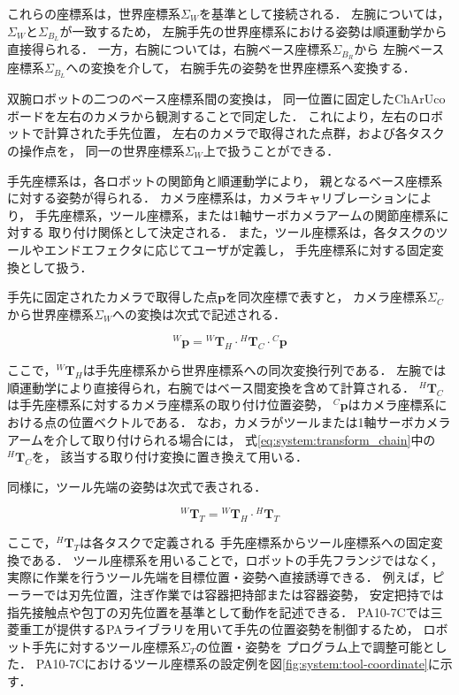 これらの座標系は，世界座標系$\Sigma_W$を基準として接続される．
左腕については，$\Sigma_W$と$\Sigma_{B_L}$が一致するため，
左腕手先の世界座標系における姿勢は順運動学から直接得られる．
一方，右腕については，右腕ベース座標系$\Sigma_{B_R}$から
左腕ベース座標系$\Sigma_{B_L}$への変換を介して，
右腕手先の姿勢を世界座標系へ変換する．

双腕ロボットの二つのベース座標系間の変換は，
同一位置に固定したChArUcoボードを左右のカメラから観測することで同定した．
これにより，左右のロボットで計算された手先位置，
左右のカメラで取得された点群，および各タスクの操作点を，
同一の世界座標系$\Sigma_W$上で扱うことができる．

手先座標系は，各ロボットの関節角と順運動学により，
親となるベース座標系に対する姿勢が得られる．
カメラ座標系は，カメラキャリブレーションにより，
手先座標系，ツール座標系，または1軸サーボカメラアームの関節座標系に対する
取り付け関係として決定される．
また，ツール座標系は，各タスクのツールやエンドエフェクタに応じてユーザが定義し，
手先座標系に対する固定変換として扱う．

手先に固定されたカメラで取得した点$\bm{p}$を同次座標で表すと，
カメラ座標系$\Sigma_C$から世界座標系$\Sigma_W$への変換は次式で記述される．

\begin{equation}
  {}^{W}\bm{p}
  =
  {}^{W}\bm{T}_{H}
  \cdot
  {}^{H}\bm{T}_{C}
  \cdot
  {}^{C}\bm{p}
  \label{eq:system:transform_chain}
\end{equation}

ここで，${}^{W}\bm{T}_{H}$は手先座標系から世界座標系への同次変換行列である．
左腕では順運動学により直接得られ，右腕ではベース間変換を含めて計算される．
${}^{H}\bm{T}_{C}$は手先座標系に対するカメラ座標系の取り付け位置姿勢，
${}^{C}\bm{p}$はカメラ座標系における点の位置ベクトルである．
なお，カメラがツールまたは1軸サーボカメラアームを介して取り付けられる場合には，
式\eqref{eq:system:transform_chain}中の${}^{H}\bm{T}_{C}$を，
該当する取り付け変換に置き換えて用いる．

同様に，ツール先端の姿勢は次式で表される．

\begin{equation}
  {}^{W}\bm{T}_{T}
  =
  {}^{W}\bm{T}_{H}
  \cdot
  {}^{H}\bm{T}_{T}
  \label{eq:system:tool_transform}
\end{equation}

ここで，${}^{H}\bm{T}_{T}$は各タスクで定義される
手先座標系からツール座標系への固定変換である．
ツール座標系を用いることで，ロボットの手先フランジではなく，
実際に作業を行うツール先端を目標位置・姿勢へ直接誘導できる．
例えば，ピーラーでは刃先位置，注ぎ作業では容器把持部または容器姿勢，
安定把持では指先接触点や包丁の刃先位置を基準として動作を記述できる．
PA10-7Cでは三菱重工が提供するPAライブラリを用いて手先の位置姿勢を制御するため，
ロボット手先に対するツール座標系$\Sigma_T$の位置・姿勢を
プログラム上で調整可能とした．
PA10-7Cにおけるツール座標系の設定例を図\ref{fig:system:tool-coordinate}に示す．

